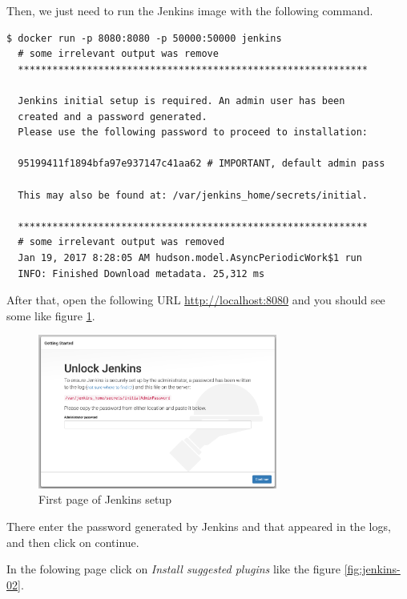 Then, we just need to run the Jenkins image with the following command.

\begin{verbatim}
$ docker run -p 8080:8080 -p 50000:50000 jenkins
  # some irrelevant output was remove
  *************************************************************

  Jenkins initial setup is required. An admin user has been 
  created and a password generated.
  Please use the following password to proceed to installation:

  95199411f1894bfa97e937147c41aa62 # IMPORTANT, default admin pass

  This may also be found at: /var/jenkins_home/secrets/initial.
 
  *************************************************************
  # some irrelevant output was removed
  Jan 19, 2017 8:28:05 AM hudson.model.AsyncPeriodicWork$1 run
  INFO: Finished Download metadata. 25,312 ms
\end{verbatim}

After that, open the following URL \url{http://localhost:8080} and you should see some like figure \ref{fig:jenkins-01}.

\begin{figure}[H]
	\centering
    \includegraphics[width=0.7\textwidth]{grafiken/jenkins-01}
    \caption{First page of Jenkins setup}
    \label{fig:jenkins-01}
\end{figure}

There enter the password generated by Jenkins and that appeared in the logs, and then click on continue.

In the folowing page click on \textit{Install suggested plugins} like the figure \ref{fig:jenkins-02}.

